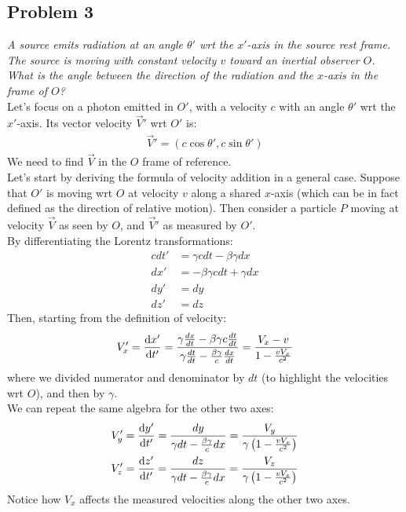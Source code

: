 \documentclass[../template.tex]{subfiles}
\begin{document}
\subsection{Problem 3}
\textit{A source emits radiation at an angle $\theta'$ wrt the $x'$-axis in the source rest frame. The source is moving with constant velocity $v$ toward an inertial observer $O$.}\\
\textit{What is the angle between the direction of the radiation and the $x$-axis in the frame of $O$?}\\

Let's focus on a photon emitted in $O'$, with a velocity $c$ with an angle $\theta'$ wrt the $x'$-axis. Its vector velocity $\vec{V}'$  wrt $O'$ is:
\begin{align*}
    \vec{V}' = (c \cos \theta', c \sin \theta')
\end{align*}
We need to find $\vec{V}$ in the $O$ frame of reference.\\

Let's start by deriving the formula of velocity addition in a general case. Suppose that $O'$ is moving wrt $O$ at velocity $v$ along a shared $x$-axis (which can be in fact defined as the direction of relative motion). Then consider a particle $P$ moving at velocity $\vec{V}$ as seen by $O$, and $\vec{V}'$ as measured by $O'$.\\
By differentiating the Lorentz transformations:
\begin{align*}
    cdt' &= \gamma c dt - \beta \gamma dx \\
    dx' &= -\beta \gamma c dt + \gamma dx \\
    dy' &=  dy \\
    dz' &=  dz
\end{align*}
Then, starting from the definition of velocity:
\begin{align*}
    V_x' = \dv{x'}{t'} = \frac{\gamma \frac{dx}{dt} - \beta \gamma c \frac{dt}{dt}  }{\gamma \frac{dt}{dt} - \frac{\beta \gamma}{c} \frac{dx}{dt}   }  = \frac{V_x - v}{1-\frac{vV_x}{c^2}}   
\end{align*}
where we divided numerator and denominator by $dt$ (to highlight the velocities wrt $O$), and then by $\gamma$.\\
We can repeat the same algebra for the other two axes:
\begin{align*}
    V_y' &=  \dv{y'}{t'} = \frac{dy}{\gamma dt - \frac{\beta \gamma}{c} dx } = \frac{V_y}{\gamma \left(1-\frac{v V_x}{c^2} \right)}    \\
    V_z' &= \dv{z'}{t'} = \frac{dz}{\gamma dt - \frac{\beta \gamma }{c} dx } = \frac{V_z}{\gamma \left(1-\frac{vV_x}{c^2} \right)}   \\
\end{align*}
Notice how $V_x$ affects the measured velocities along the other two axes.\\
\end{document}
